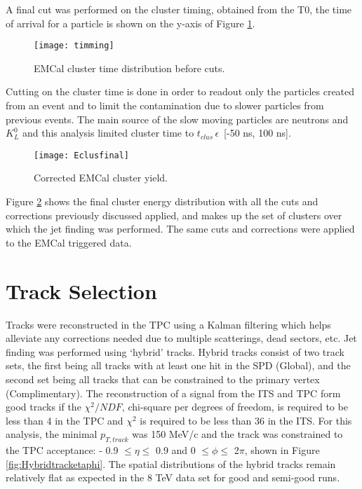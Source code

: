 A final cut was performed on the cluster timing, obtained from the T0, the time of arrival for a particle is shown on the y-axis of Figure \ref{fig:EMCaltime}.  

\begin{figure}[!h]
\texttt{[image: timming]}
\centering
\caption{EMCal cluster time distribution before cuts.}
\label{fig:EMCaltime}
\end{figure}


Cutting on the cluster time is done in order to readout only the particles created from an event and to limit the contamination due to slower particles from previous events.  The main source of the slow moving particles are neutrons and $K_{L}^{0}$ and this analysis limited cluster time to $t_{clus} \, \epsilon \,$ [-50 ns, 100 ns].


\begin{figure}[h]
\texttt{[image: Eclusfinal]}
\centering
\caption{Corrected EMCal cluster yield.}
\label{fig:EMCalfinal}
\end{figure}
\newpage

Figure \ref{fig:EMCalfinal} shows the final cluster energy distribution with all the cuts and corrections previously discussed applied, and makes up the set of clusters over which the jet finding was performed.  The same cuts and corrections were applied to the EMCal triggered data.

\section{Track Selection}

Tracks were reconstructed in the TPC using a Kalman filtering which helps alleviate any corrections needed due to multiple scatterings, dead sectors, etc.  Jet finding was performed using `hybrid' tracks.  Hybrid tracks consist of two track sets, the first being all tracks with at least one hit in the SPD (Global), and the second set being all tracks that can be constrained to the primary vertex (Complimentary).  The reconstruction of a signal from the ITS and TPC form good tracks if the $\chi^{2}/NDF$, chi-square per degrees of freedom, is required to be less than 4 in the TPC and $\chi^{2}$ is required to be less than 36 in the ITS. For this analysis, the minimal $p_{T, track}$ was 150 MeV/c and the track was constrained to the TPC acceptance: - 0.9 $\leq \eta \leq$ 0.9 and 0 $\leq \phi \leq$ 2$\pi$, shown in Figure \ref{fig:Hybridtracketaphi}.  The spatial distributions of the hybrid tracks remain relatively flat as expected in the 8 TeV data set for good and semi-good runs.

